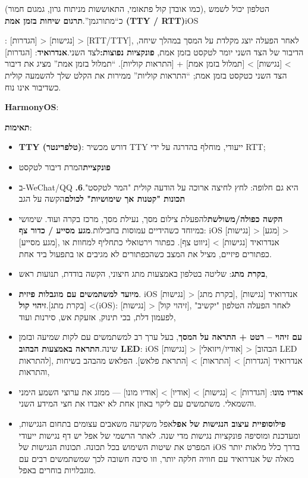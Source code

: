 
(כמו אובדן קול פתאומי, התאוששות מניתוח גרון, גמגום חמור), הטלפון יכול לשמש כ“מתורגמן”.\textbf{תרגום שיחות בזמן אמת (TTY / RTT)}iOS

\begin{tcbinfo}{: [הגדרות] > [נגישות] > [RTT/TTY], לאחר הפעלה יוצג מקלדת על המסך במהלך שיחה, הדיבור של הצד השני יומר לטקסט בזמן אמת,}
\textbf{פונקציות נפוצות:}לצד השני.\textbf{אנדרואיד}: [הגדרות] > [נגישות] > [תמלול בזמן אמת] + [התראות קוליות]. “תמלול בזמן אמת” מציג את דיבור הצד השני כטקסט בזמן אמת; “התראות קוליות” ממירות את הקלט שלך להשמעה קולית כשדיבור אינו נוח.

\textbf{HarmonyOS}:

\textbf{תאימות}:

\begin{itemize}
  \item \textbf{TTY (טלפרינטר)}: דורש מכשיר TTY ייעודי, מוחלף בהדרגה על ידי RTT;
  \item \textbf{פונקציית}המרת דיבור לטקסט
  \item ב-WeChat/QQ היא גם חלופה: לחץ לחיצה ארוכה על הודעה קולית "המר לטקסט".\textbf{6. תכונות "קטנות אך שימושיות" לכולם}הקשה על הגב
\end{itemize}

\end{tcbinfo}


\begin{itemize}
  \item \textbf{הקשה כפולה/משולשת}להפעלת צילום מסך, נעילת מסך, מרכז בקרה ועוד. שימושי במיוחד כשהידיים עמוסות בחבילות.\textbf{מגע מסייע / כדור צף}: iOS [נגישות] > [מגע] > [מגע מסייע], אנדרואיד [נגישות] > [ניווט צף]. כפתור וירטואלי כתחליף למחוות או כפתורים פיזיים, מציל את המצב כשהכפתורים לא מגיבים או בתפעול ביד אחת.
  \item \textbf{בקרת מתג}: שליטה בטלפון באמצעות מתג חיצוני, הקשה בודדת, תנועות ראש,
  \item \textbf{מיועד למשתמשים עם מוגבלות פיזית}. iOS [נגישות] > [בקרת מתג], אנדרואיד [נגישות] > [בקרת מתג].\textbf{זיהוי קול}(iOS): [נגישות] > [זיהוי קול], לאחר הפעלה הטלפון "יקשיב" לפעמון דלת, בכי תינוק, אזעקת אש, סירנות ועוד,
  \item \textbf{עם זיהוי – רטט + התראה על המסך}, בעל ערך רב למשתמשים עם לקות שמיעה ובזמן שינה.\textbf{התראה באמצעות הבהוב LED}: iOS [נגישות] > [אודיו/ויזואלי] > [הבהוב LED להתראות], אנדרואיד [הגדרות] > [התראות] > [התראת פלאש]. הפלאש מהבהב בשיחות והתראות,
  \item \textbf{אודיו מונו}: [הגדרות] > [נגישות] > [אודיו] > [אודיו מונו] — ממזג את ערוצי השמע הימני והשמאלי. משתמשים עם ליקוי באוזן אחת לא יאבדו את חצי המידע השני.
  \item \textbf{פילוסופיית עיצוב הנגישות של אפל}אפל משקיעה משאבים עצומים בתחום הנגישות, ומעדכנת ומוסיפה פונקציות נגישות מדי שנה. לאתר הרשמי של אפל יש דף נגישות ייעודי המפרט את שיטות השימוש בכל תכונה. תכונות הנגישות של iOS בדרך כלל מלאות יותר מאלה של אנדרואיד עם חוויה חלקה יותר, וזו סיבה חשובה לכך שמשתמשים רבים עם מוגבלויות בוחרים באפל.
\end{itemize}

